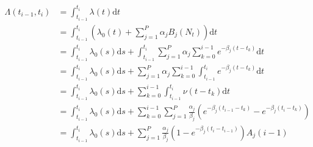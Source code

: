 \documentclass{article}
\newcommand{\mathd}{\mathrm{d}}
\begin{document}
$\begin{array}{ll}
  \Lambda ( t_{i - 1}, t_i) & = \int_{t_{i - 1}}^{t_i} \lambda ( t) \mathd t\\
  & = \int_{t_{i - 1}}^{t_i} \left( \lambda_0 ( t) + \sum_{j = 1}^P \alpha_j
  B_j ( N_t) \right) \mathd t\\
  & = \int_{t_{i - 1}^{}}^{t_i} \lambda_0 ( s) \mathd s + \int_{t_{i -
  1}^{}}^{t_i} \sum_{j = 1}^P \alpha_j \sum_{k = 0}^{i - 1} e^{- \beta_j ( t -
  t_k)} \mathd t\\
  & = \int_{t_{i - 1}^{}}^{t_i} \lambda_0 ( s) \mathd s + \sum_{j = 1}^P
  \alpha_j \sum_{k = 0}^{i - 1}  \int_{t_{i - 1}^{}}^{t_i} e^{- \beta_j ( t -
  t_k)} \mathd t\\
  & = \int_{t_{i - 1}^{}}^{t_i} \lambda_0 ( s) \mathd s + \sum_{k = 0}^{i -
  1} \int_{t_{i - 1}}^{t_i} \nu ( t - t_k) \mathd t\\
  & = \int_{t_{i - 1}^{}}^{t_i} \lambda_0 ( s) \mathd s + \sum_{k = 0}^{i -
  1} \sum_{j = 1}^P \frac{\alpha_j}{\beta_j} ( e^{- \beta_j ( t_{i - 1} -
  t_k)} - e^{- \beta_j ( t_i - t_k)})\\
  & = \int_{t_{i - 1}^{}}^{t_i} \lambda_0 ( s) \mathd s + \sum_{j = 1}^P
  \frac{\alpha_j}{\beta_j} ( 1 - e^{- \beta_j ( t_i - t_{i - 1})}) A_j ( i -
  1)
\end{array}$
\end{document}
